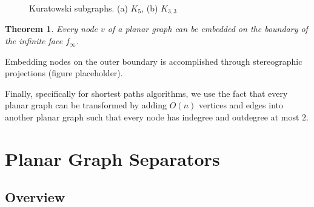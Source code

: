 \documentclass[12pt]{article}
\newtheorem{theorem}{Theorem}[section]
\begin{document}
\begin{figure}[!t]
  \centering
  \hfil
  \caption{Kuratowski subgraphs. (a) $K_5$, (b) $K_{3,3}$}
  \label{fig:kuratowski}
\end{figure}

\begin{theorem}
  Every node $v$ of a planar graph can be embedded on the boundary of the infinite face $f_{\infty}$.
\end{theorem}

Embedding nodes on the outer boundary is accomplished through stereographic projections (figure placeholder).

Finally, specifically for shortest paths algorithms, we use the fact that every planar graph can be transformed by adding $O(n)$ vertices and edges into another planar graph such that every node has indegree and outdegree at most $2$.

\section{Planar Graph Separators}
\label{sec:graph-sep}


    \subsection{Overview}
    \label{sec:graph-sep-overview}
\end{document}
